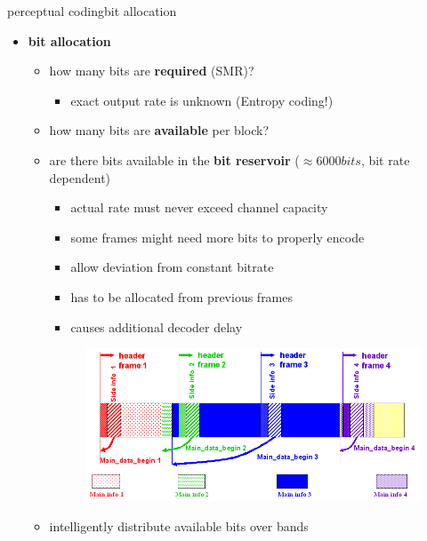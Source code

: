 	\begin{frame}{perceptual coding}{bit allocation}
        \vspace{-1mm}
		\begin{itemize}
			\item	\textbf{bit allocation}
				\begin{itemize}
                    \item   how many bits are \textbf{required} (SMR)?
                        \begin{itemize}
                            \item   exact output rate is unknown (Entropy coding!)
                        \end{itemize}
					\item	how many bits are \textbf{available} per block?
					\item	are there bits available in the \textbf{bit reservoir} ($\approx 6000 bits$, bit rate dependent)
                        \begin{itemize}
                            \item   actual rate must never exceed channel capacity
                            \item   some frames might need more bits to properly encode
                            \item   allow deviation from constant bitrate 
                            \item   has to be allocated from previous frames 
                            \item   causes additional decoder delay
                        \end{itemize}
                        \begin{figure}
                            \includegraphics[scale=.2]{graph/bit_reservoir}
                        \end{figure}
					\item	intelligently distribute available bits over bands 
				\end{itemize}
		\end{itemize}
	\end{frame}
	
